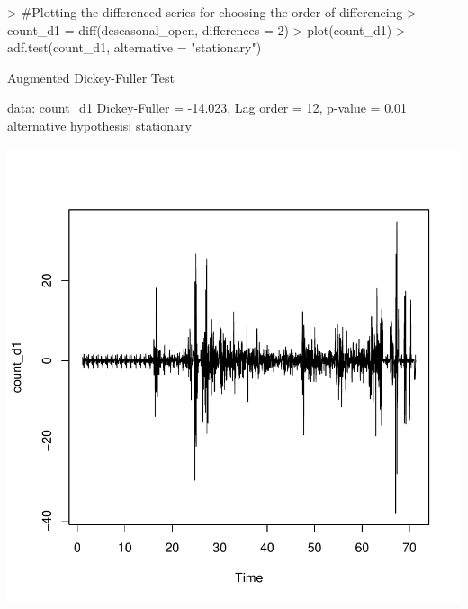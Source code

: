 \documentclass{article}
\begin{document}
\begin{Schunk}
\begin{Sinput}
> #Plotting the differenced series for choosing the order of differencing
> count_d1 = diff(deseasonal_open, differences = 2)
> plot(count_d1)
> adf.test(count_d1, alternative = "stationary")
\end{Sinput}
\begin{Soutput}
	Augmented Dickey-Fuller Test

data:  count_d1
Dickey-Fuller = -14.023, Lag order = 12, p-value = 0.01
alternative hypothesis: stationary
\end{Soutput}
\end{Schunk}
\includegraphics{Report-015}
\end{document}
